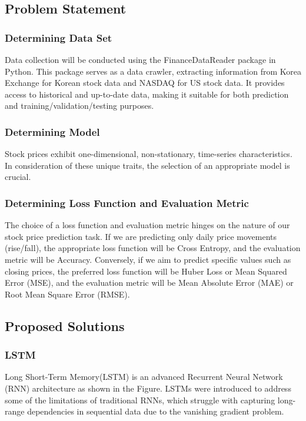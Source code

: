 \subsection{Problem Statement}

\subsubsection{Determining Data Set}

Data collection will be conducted using the FinanceDataReader package in Python\cite{FinanceDataReader}. 
This package serves as a data crawler, extracting information from Korea Exchange\cite{KRX} for Korean stock data and NASDAQ\cite{NASDAQ} for US stock data. 
It provides access to historical and up-to-date data, making it suitable for both prediction and training/validation/testing purposes.

\subsubsection{Determining Model}

Stock prices exhibit one-dimensional, non-stationary, time-series characteristics. 
In consideration of these unique traits, the selection of an appropriate model is crucial.

\subsubsection{Determining Loss Function and Evaluation Metric}

The choice of a loss function and evaluation metric hinges on the nature of our stock price prediction task. 
If we are predicting only daily price movements (rise/fall), the appropriate loss function will be Cross Entropy, and the evaluation metric will be Accuracy. 
Conversely, if we aim to predict specific values such as closing prices, the preferred loss function will be Huber Loss or Mean Squared Error (MSE), 
and the evaluation metric will be Mean Absolute Error (MAE) or Root Mean Square Error (RMSE).

\subsection{Proposed Solutions}
\subsubsection{LSTM}
Long Short-Term Memory(LSTM) is an advanced Recurrent Neural Network (RNN) architecture 
as shown in the Figure. 
LSTMs were introduced to address some of the limitations of traditional RNNs, 
which struggle with capturing long-range dependencies in sequential data due to the vanishing gradient problem.

